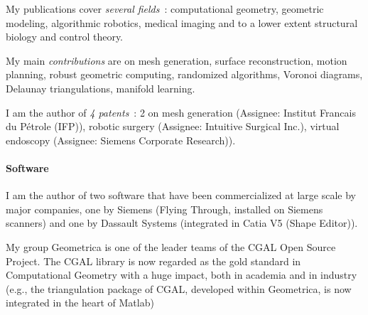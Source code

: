 My publications cover {\em several fields}~: computational geometry, geometric modeling, algorithmic robotics, medical imaging and to a lower extent structural biology and control theory.

My main {\em contributions} are on  mesh generation, surface reconstruction, motion planning, robust geometric computing, randomized algorithms, Voronoi diagrams, Delaunay triangulations, manifold learning.

I am the author of {\em 4 patents}~: 2 on mesh generation (Assignee: Institut Francais du P\'etrole (IFP)), robotic surgery (Assignee: Intuitive Surgical Inc.), virtual endoscopy (Assignee: Siemens Corporate Research)).

\paragraph{Software} \mbox{}

I am the author of two software that have been commercialized at large scale by major companies, one by Siemens (Flying Through, installed on Siemens scanners) and one by Dassault Systems (integrated in Catia V5 (Shape Editor)). 

My group Geometrica is one of the leader teams of  the CGAL Open Source Project.  The CGAL library  is now regarded as the gold standard in Computational Geometry with a huge impact, both in academia and in industry (e.g., the triangulation package of CGAL, developed within Geometrica, is now integrated in the heart of Matlab)










